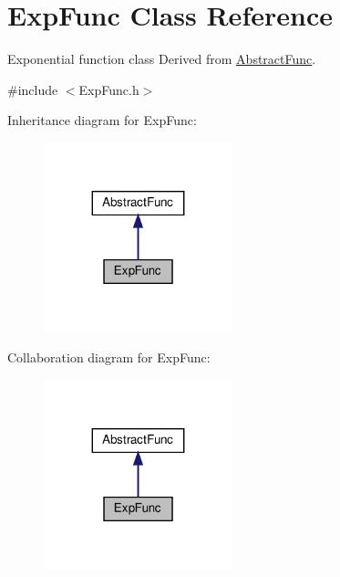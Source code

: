 \hypertarget{classExpFunc}{}\section{Exp\+Func Class Reference}
\label{classExpFunc}


Exponential function class Derived from \hyperlink{classAbstractFunc}{Abstract\+Func}.  




{\ttfamily \#include $<$Exp\+Func.\+h$>$}



Inheritance diagram for Exp\+Func\+:\nopagebreak
\begin{figure}[H]
\begin{center}
\leavevmode
\includegraphics[width=155pt]{classExpFunc__inherit__graph}
\end{center}
\end{figure}


Collaboration diagram for Exp\+Func\+:\nopagebreak
\begin{figure}[H]
\begin{center}
\leavevmode
\includegraphics[width=155pt]{classExpFunc__coll__graph}
\end{center}
\end{figure}
